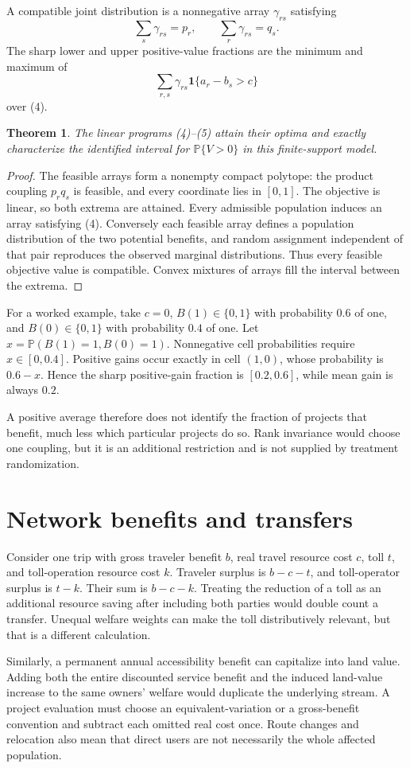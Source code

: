 \documentclass[11pt,a4paper]{article}
\newtheorem{theorem}{Theorem}[section]
\newcommand{\Prob}{\mathbb P}
\newcommand{\ind}{\mathbf 1}
\begin{document}
A compatible joint distribution is a nonnegative array $\gamma_{rs}$ satisfying
\[
 \sum_s\gamma_{rs}=p_r,\qquad
 \sum_r\gamma_{rs}=q_s.
 \tag{4}
\]
The sharp lower and upper positive-value fractions are the minimum and maximum of
\[
 \sum_{r,s}\gamma_{rs}\ind\{a_r-b_s>c\}
 \tag{5}
\]
over (4).
\begin{theorem}
The linear programs (4)--(5) attain their optima and exactly characterize the identified interval for $\Prob\{V>0\}$ in this finite-support model.
\end{theorem}
\begin{proof}
The feasible arrays form a nonempty compact polytope: the product coupling $p_rq_s$ is feasible, and every coordinate lies in $[0,1]$. The objective is linear, so both extrema are attained. Every admissible population induces an array satisfying (4). Conversely each feasible array defines a population distribution of the two potential benefits, and random assignment independent of that pair reproduces the observed marginal distributions. Thus every feasible objective value is compatible. Convex mixtures of arrays fill the interval between the extrema.
\end{proof}
For a worked example, take $c=0$, $B(1)\in\{0,1\}$ with probability $0.6$ of one, and $B(0)\in\{0,1\}$ with probability $0.4$ of one. Let $x=\Prob(B(1)=1,B(0)=1)$. Nonnegative cell probabilities require $x\in[0,0.4]$. Positive gains occur exactly in cell $(1,0)$, whose probability is $0.6-x$. Hence the sharp positive-gain fraction is $[0.2,0.6]$, while mean gain is always $0.2$.

A positive average therefore does not identify the fraction of projects that benefit, much less which particular projects do so. Rank invariance would choose one coupling, but it is an additional restriction and is not supplied by treatment randomization.
\section{Network benefits and transfers}
Consider one trip with gross traveler benefit $b$, real travel resource cost $c$, toll $t$, and toll-operation resource cost $k$. Traveler surplus is $b-c-t$, and toll-operator surplus is $t-k$. Their sum is $b-c-k$. Treating the reduction of a toll as an additional resource saving after including both parties would double count a transfer. Unequal welfare weights can make the toll distributively relevant, but that is a different calculation.

Similarly, a permanent annual accessibility benefit can capitalize into land value. Adding both the entire discounted service benefit and the induced land-value increase to the same owners' welfare would duplicate the underlying stream. A project evaluation must choose an equivalent-variation or a gross-benefit convention and subtract each omitted real cost once. Route changes and relocation also mean that direct users are not necessarily the whole affected population.
\end{document}
